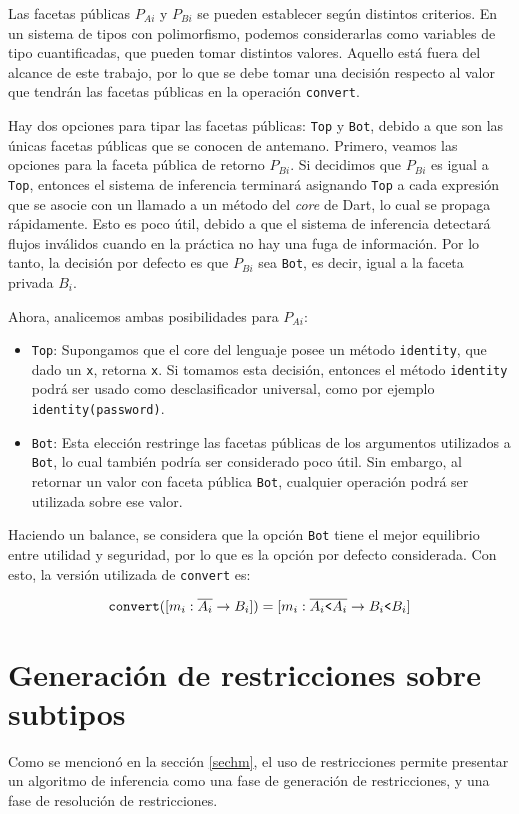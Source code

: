 Las facetas públicas $P_{Ai}$ y $P_{Bi}$ se pueden establecer según distintos criterios. En un sistema de tipos con polimorfismo, podemos considerarlas como variables de tipo cuantificadas, que pueden tomar distintos valores. Aquello está fuera del alcance de este trabajo, por lo que se debe tomar una decisión respecto al valor que tendrán las facetas públicas en la operación \texttt{convert}.

Hay dos opciones para tipar las facetas públicas: \texttt{Top} y \texttt{Bot}, debido a que son las únicas facetas públicas que se conocen de antemano. Primero, veamos las opciones para la faceta pública de retorno $P_{Bi}$. Si decidimos que $P_{Bi}$ es igual a \texttt{Top}, entonces el sistema de inferencia terminará asignando \texttt{Top} a cada expresión que se asocie con un llamado a un método del \emph{core} de Dart, lo cual se propaga rápidamente. Esto es poco útil, debido a que el sistema de inferencia detectará flujos inválidos cuando en la práctica no hay una fuga de información. Por lo tanto, la decisión por defecto es que $P_{Bi}$ sea \texttt{Bot}, es decir, igual a la faceta privada $B_i$.

Ahora, analicemos ambas posibilidades para $P_{Ai}$:

\begin{itemize}
  \item \texttt{Top}: Supongamos que el core del lenguaje posee un método \texttt{identity}, que dado un \texttt{x}, retorna \texttt{x}. Si tomamos esta decisión, entonces el método \texttt{identity} podrá ser usado como desclasificador universal, como por ejemplo \texttt{identity(password)}.
  \item \texttt{Bot}: Esta elección restringe las facetas públicas de los argumentos utilizados a \texttt{Bot}, lo cual también podría ser considerado poco útil. Sin embargo, al retornar un valor con faceta pública \texttt{Bot}, cualquier operación podrá ser utilizada sobre ese valor.
\end{itemize}

Haciendo un balance, se considera que la opción \texttt{Bot} tiene el mejor equilibrio entre utilidad y seguridad, por lo que es la opción por defecto considerada. Con esto, la versión utilizada de \texttt{convert} es:

\[
\mathtt{convert}([m_i: \overline{A_i} \rightarrow B_i]) = [m_i: \overline{A_i\text{\texttt{<}}A_i} \rightarrow B_i\text{\texttt{<}}B_i]
\]

\section{Generación de restricciones sobre subtipos} \label{propuestaGen}
Como se mencionó en la sección \ref{sechm}, el uso de restricciones permite presentar un algoritmo de inferencia como una fase de generación de restricciones, y una fase de resolución de restricciones.

